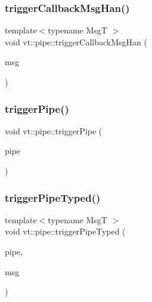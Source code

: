 \subsubsection{\texorpdfstring{trigger\+Callback\+Msg\+Han()}{triggerCallbackMsgHan()}}
{\footnotesize\ttfamily template$<$typename MsgT $>$ \\
void vt\+::pipe\+::trigger\+Callback\+Msg\+Han (\begin{DoxyParamCaption}\item[{MsgT $\ast$}]{msg }\end{DoxyParamCaption})}

\mbox{\label{namespacevt_1_1pipe_ac55cd91c8aee610ae0e8b1843229a285}} 
\subsubsection{\texorpdfstring{trigger\+Pipe()}{triggerPipe()}}
{\footnotesize\ttfamily void vt\+::pipe\+::trigger\+Pipe (\begin{DoxyParamCaption}\item[{\hyperlink{namespacevt_ac9852acda74d1896f48f406cd72c7bd3}{Pipe\+Type} const \&}]{pipe }\end{DoxyParamCaption})}

\mbox{\label{namespacevt_1_1pipe_a1fea0e249e8f363c86cff32d9034238e}} 
\subsubsection{\texorpdfstring{trigger\+Pipe\+Typed()}{triggerPipeTyped()}}
{\footnotesize\ttfamily template$<$typename MsgT $>$ \\
void vt\+::pipe\+::trigger\+Pipe\+Typed (\begin{DoxyParamCaption}\item[{\hyperlink{namespacevt_ac9852acda74d1896f48f406cd72c7bd3}{Pipe\+Type} const \&}]{pipe,  }\item[{MsgT $\ast$}]{msg }\end{DoxyParamCaption})}

\mbox{\label{namespacevt_1_1pipe_ae131e6afcc435107fcd51771caa9abc9}} 
